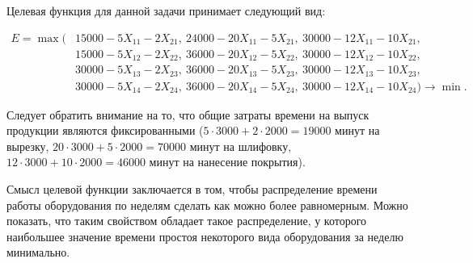 Целевая функция для данной задачи принимает следующий вид:
\begin{small}
  \begin{align*}
    E = \max( 
  & 15000 - 5X_{11} - 2X_{21}, \: 24000 - 20X_{11} - 5X_{21}, \: 30000 - 12X_{11} - 10X_{21}, \\
  & 15000 - 5X_{12} - 2X_{22}, \: 36000 - 20X_{12} - 5X_{22}, \: 30000 - 12X_{12} - 10X_{22}, \\
  & 30000 - 5X_{13} - 2X_{23}, \: 36000 - 20X_{13} - 5X_{23}, \: 30000 - 12X_{13} - 10X_{23}, \\  
  & 30000 - 5X_{14} - 2X_{24}, \: 36000 - 20X_{14} - 5X_{24}, \: 30000 - 12X_{14} - 10X_{24} ) \rightarrow \min.
  \end{align*}
\end{small}

\vspace{-7mm}

Следует обратить внимание на то, что общие затраты времени на выпуск
продукции являются фиксированными
(\( 5 \cdot 3000 + 2 \cdot 2000 = 19000 \) минут на вырезку,
\( 20 \cdot 3000 + 5 \cdot 2000 = 70000 \) минут на шлифовку,
\( 12 \cdot 3000 + 10 \cdot 2000 = 46000 \) минут на нанесение покрытия).

Смысл целевой функции заключается в том, чтобы распределение времени работы
оборудования по неделям сделать как можно более равномерным. 
Можно показать, что таким свойством обладает такое распределение, 
у которого наибольшее значение времени простоя некоторого вида
оборудования за неделю минимально.